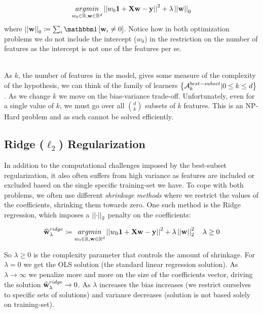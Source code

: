 \begin{equation}
\underset{w_0\in\mathbb{R}, \mathbf{w}\in\mathbb{R}^d}{argmin} \left|\left| w_0\mathbf{1} + \mathbf{X}\mathbf{w} - \mathbf{y}\right|\right|^2 + \lambda\left|\left| \mathbf{w}\right|\right|_0
\label{eqn:l0_reg}
\end{equation}
where $\norm{\w}_0\coloneqq \sum_i \indc{\w_i \neq 0}$. Notice how in both optimization problems we do not include the intercept ($w_0$) in the restriction on the number of features as the intercept is not one of the features per se.
\\~\\

As $k$, the number of features in the model, gives some measure of the complexity of the hypothesis, we can think of the family of learners $\left\{\mathcal{A}^{best-subset}_k | 0\leq k\leq d\right\}$. As we change $k$ we move on the bias-variance trade-off. Unfortunately, even for a single value of $k$, we must go over all ${d \choose k}$ subsets of $k$ features. This is an NP-Hard problem and as such cannot be solved efficiently. 



\subsection{Ridge ($\ell_2$) Regularization}
In addition to the computational challenges imposed by the best-subset regularization, it also often suffers from high variance as features are included or excluded based on the single specific training-set we have. To cope with both problems, we often use different \textit{shrinkage methods} where we restrict the values of the coefficients, shrinking them towards zero. One such method is the Ridge regression, which imposes a $\left|\left| \cdot\right|\right|_2$ penalty on the coefficients:

\begin{equation}
\widehat{\mathbf{w}}^{ridge}_{\lambda}\coloneqq\underset{w_0\in\mathbb{R}, \mathbf{w}\in\mathbb{R}^d}{argmin} \left|\left| w_0\mathbf{1} + \mathbf{X}\mathbf{w} - \mathbf{y}\right|\right|^2 + \lambda\left|\left| \mathbf{w}\right|\right|_2^2\quad \lambda\geq 0
\label{eqn:l2_reg}
\end{equation}

So $\lambda\geq 0$ is the complexity parameter that controls the amount of shrinkage. For $\lambda=0$ we get the OLS solution (the standard linear regression solution). As $\lambda \rightarrow \infty$ we penalize more and more on the size of the coefficients vector, driving the solution $\widehat{\mathbf{w}}^{ridge}_{\lambda}\rightarrow 0$. As $\lambda$ increases the bias increases (we restrict ourselves to specific sets of solutions) and variance decreases (solution is not based solely on training-set).

